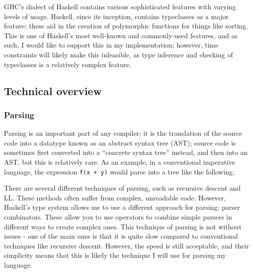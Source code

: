 \documentclass[9pt]{extarticle}
\begin{document}
GHC's dialect of Haskell contains various sophisticated features with varying
levels of usage. Haskell, since its inception, contains typeclasses as a major
feature; these aid in the creation of polymorphic functions for things like
sorting. This is one of Haskell's most well-known and commonly-used features,
and as such, I would like to support this in my implementation; however, time
constraints will likely make this infeasible, as type inference and checking of
typeclasses is a relatively complex feature.

\subsection{Technical overview}

\subsubsection{Parsing}

Parsing is an important part of any compiler; it is the translation of the
source code into a datatype known as an abstract syntax tree (AST); source code
is sometimes first converted into a ``concrete syntax tree'' instead, and then
into an AST, but this is relatively rare. As an example, in a conventional
imperative language, the expression \verb'f(x + y)' would parse into a tree like the
following:

\vspace{0.5cm}

\begin{center}
\end{center}

\vspace{0.5cm}

There are several different techniques of parsing, such as recursive descent and
LL. These methods often suffer from complex, unreadable code. However, Haskell's
type system allows me to use a different approach for parsing: parser
combinators. These allow you to use operators to combine simple parsers in
different ways to create complex ones. This technique of parsing is not without
issues - one of the main ones is that it is quite slow compared to conventional
techniques like recursive descent. However, the speed is still acceptable, and
their simplicity means that this is likely the technique I will use for parsing
my language.
\end{document}
